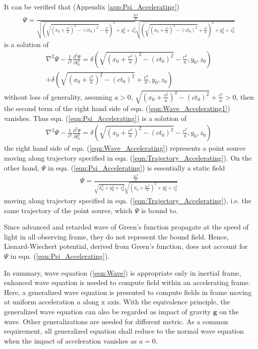 \documentclass[prd,showpacs,preprint]{revtex4-1}
\begin{document}
It can be verified that (Appendix \ref{app:Psi_Accelerating})
\begin{eqnarray}
\Psi=\frac{\frac{2c^2}{a}}{\sqrt{(\sqrt{(x_0+\frac{c^2}{a})^2-(ct_0)^2}-\frac{c^2}{a})^2+y_0^2+z_0^2}\sqrt{(\sqrt{(x_0+\frac{c^2}{a})^2-(ct_0)^2}+\frac{c^2}{a})^2+y_0^2+z_0^2}}
\label{eqn:Psi_Accelerating}
\end{eqnarray}
is a solution of
\begin{eqnarray}
\nabla^2\Psi-\frac{1}{c^2}\frac{\partial^2 \Psi}{\partial t_0^2}=\delta(\sqrt{(x_0+\frac{c^2}{a})^2-(ct_0)^2}-\frac{c^2}{a},y_0,z_0)\nonumber\\
+\delta(\sqrt{(x_0+\frac{c^2}{a})^2-(ct_0)^2}+\frac{c^2}{a},y_0,z_0)
\label{eqn:Wave_Accelerating1}
\end{eqnarray}
without loss of generality, assuming $a>0$, $\sqrt{(x_0+\frac{c^2}{a})^2-(ct_0)^2}+\frac{c^2}{a}>0$, then the second term of the right hand side of eqn. (\ref{eqn:Wave_Accelerating1}) vanishes. Thus eqn. (\ref{eqn:Psi_Accelerating}) is a solution of
\begin{eqnarray}
\nabla^2\Psi-\frac{1}{c^2}\frac{\partial^2 \Psi}{\partial t_0^2}=\delta(\sqrt{(x_0+\frac{c^2}{a})^2-(ct_0)^2}-\frac{c^2}{a},y_0,z_0)
\label{eqn:Wave_Accelerating}
\end{eqnarray}
the right hand side of eqn. (\ref{eqn:Wave_Accelerating}) represents a point source moving along trajectory specified in eqn. (\ref{eqn:Trajectory_Accelerating}). On the other hand, $\Psi$ in eqn. (\ref{eqn:Psi_Accelerating}) is essentially a static field
\begin{eqnarray}
\Psi=\frac{\frac{2c^2}{a}}{\sqrt{\bar x_0^2+y_0^2+z_0^2}\sqrt{(\bar x_0+\frac{2c^2}{a})^2+y_0^2+z_0^2}}
\end{eqnarray}
moving along trajectory specified in eqn. (\ref{eqn:Trajectory_Accelerating}), i.e. the same trajectory of the point source, which $\Psi$ is bound to.

Since advanced and retarded wave of Green's function propagate at the speed of light in all observing frame, they do not represent the bound field. Hence, Lienard-Wiechert potential, derived from Green's function, does not account for $\Psi$ in eqn. (\ref{eqn:Psi_Accelerating}).

In summary, wave equation (\ref{eqn:Wave}) is appropriate only in inertial frame, enhanced wave equation is needed to compute field within an accelerating frame. Here, a generalized wave equation is presented to compute fields in frame moving at uniform acceleration $a$ along x axis. With the equivalence principle, the generalized wave equation can also be regarded as impact of gravity $\mathbf{g}$ on the wave. Other generalizations are needed for different metric. As a common requirement, all generalized equation shall reduce to the normal wave equation when the impact of acceleration vanishes as $a=0$.
\end{document}
